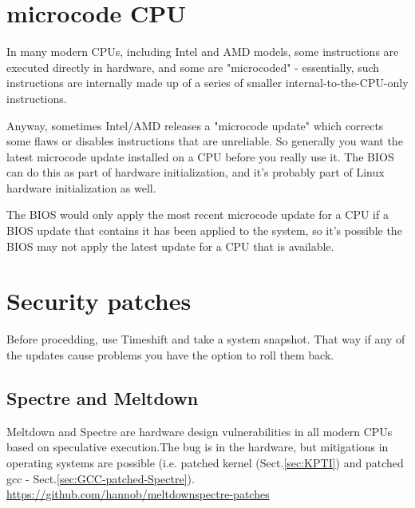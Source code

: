 \section{microcode CPU}
\label{sec:microcode-cpu}	

In many modern CPUs, including Intel and AMD models, some instructions are
executed directly in hardware, and some are "microcoded" - essentially, such
instructions are internally made up of a series of smaller
internal-to-the-CPU-only instructions.


Anyway, sometimes Intel/AMD releases a "microcode update" which corrects some
flaws or disables instructions that are unreliable. So generally you want the
latest microcode update installed on a CPU before you really use it. The BIOS
can do this as part of hardware initialization, and it's probably part of Linux
hardware initialization as well.

The BIOS would only apply the most recent microcode update for a CPU if a BIOS
update that contains it has been applied to the system, so it's possible the
BIOS may not apply the latest update for a CPU that is available.





\section{Security patches}


Before procedding, use Timeshift and take a system snapshot. That way if any of
the updates cause problems you have the option to roll them back.


\subsection{Spectre and Meltdown}
\label{sec:Meltdown}
\label{sec:Spectre}

Meltdown and Spectre are hardware design vulnerabilities in all modern CPUs
based on speculative execution.The bug is in the hardware, but mitigations in
operating systems are possible (i.e. patched kernel (Sect.\ref{sec:KPTI}) and
patched gcc - Sect.\ref{sec:GCC-patched-Spectre}).
\url{https://github.com/hannob/meltdownspectre-patches}

